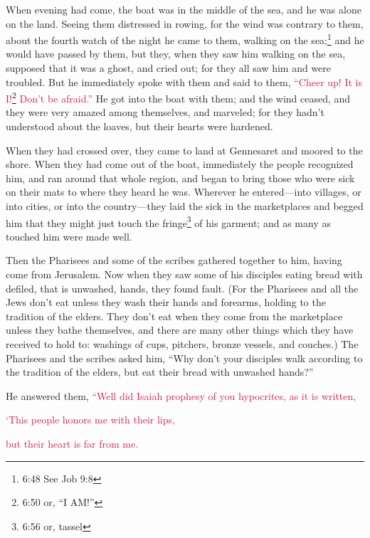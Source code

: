 \myverse{}When evening had come, the boat was in the middle of the sea,
and he was alone on the land.
\myverse{}Seeing them distressed in rowing, for the wind was contrary to them, about
the fourth watch of the night he came to them, walking on the sea;\footnote{6:48 See
	Job 9:8} and he would have passed by them,
\myverse{}but they, when they saw him walking on the sea, supposed that it was a ghost,
and cried out;
\myverse{}for they all saw him and were troubled. But he immediately spoke with them
and said to them,
\textcolor{crimson}{“Cheer up! It is I!}\footnote{6:50 or, “I AM!”}
\textcolor{crimson}{Don’t be afraid.”}
\myverse{}He got into the boat with them; and the wind ceased, and they were very amazed
among themselves, and marveled;
\myverse{}for they hadn’t understood about the loaves, but their hearts were hardened.

\myverse{}When they had crossed over, they came to land at Gennesaret and
moored to the shore.
\myverse{}When they had come out of the boat, immediately the people recognized him,
\myverse{}and ran around that whole region, and began to bring those who were sick on
their mats to where they heard he was.
\myverse{}Wherever he entered—into villages, or into cities, or into the country—they
laid the sick in the marketplaces and begged him that they might just touch the fringe\footnote{6:56 or, tassel} of his garment; and as many as touched him were made well.


\mychapter{} \myverse*{}Then the Pharisees and some of the scribes gathered together to
him, having come from Jerusalem.
\myverse{}Now when they saw some of his disciples eating bread with defiled, that is unwashed,
hands, they found fault.
\myverse{}(For the Pharisees and all the Jews don’t eat unless they wash their hands and
forearms, holding to the tradition of the elders.
\myverse{}They don’t eat when they come from the marketplace unless they bathe themselves,
and there are many other things which they have received to hold to: washings of cups, pitchers, bronze
vessels, and couches.)
\myverse{}The Pharisees and the scribes asked him, “Why don’t your disciples walk according
to the tradition of the elders, but eat their bread with unwashed hands?”

\myverse{}He answered them,
\textcolor{crimson}{“Well did Isaiah prophesy of you hypocrites, as it is written,}

\textcolor{crimson}{‘This people honors me with their lips,}

\textcolor{crimson}{but their heart is far from me.}

